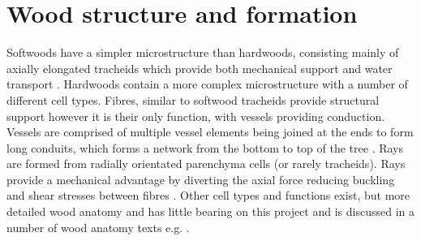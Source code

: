 \section{Wood structure and formation}
Softwoods have a simpler microstructure than hardwoods, consisting mainly of
axially elongated tracheids which provide both mechanical support and water
transport \cite{bowyer2007forest}. Hardwoods contain a more complex microstructure with a number
of different cell types. Fibres, similar to softwood tracheids provide
structural support however it is their only function, with vessels providing
conduction. Vessels are comprised of
multiple vessel elements being joined at the ends to form long conduits, which
forms a network from the bottom to top of the tree \cite{walker1993primary}. Rays are formed from radially orientated  parenchyma cells (or rarely tracheids). Rays provide a mechanical advantage by diverting the axial force reducing buckling and shear stresses between fibres \cite{mattheck1997wood}. Other cell types and functions exist, but more detailed wood anatomy and
has little bearing on this project and is discussed in a number of wood anatomy
texts e.g. \cite{fromm2013cellular}.